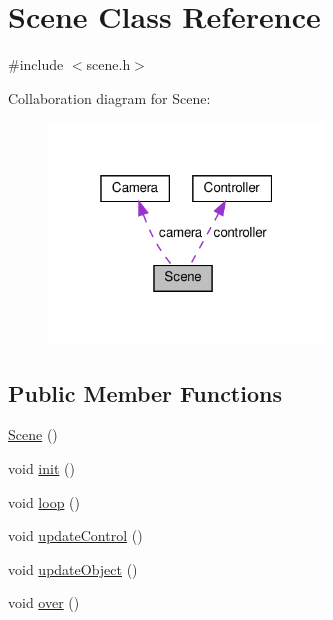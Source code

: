 \hypertarget{classScene}{}\section{Scene Class Reference}
\label{classScene}


{\ttfamily \#include $<$scene.\+h$>$}



Collaboration diagram for Scene\+:\nopagebreak
\begin{figure}[H]
\begin{center}
\leavevmode
\includegraphics[width=208pt]{classScene__coll__graph}
\end{center}
\end{figure}
\subsection*{Public Member Functions}
\begin{DoxyCompactItemize}
\item 
\hyperlink{classScene_ad10176d75a9cc0da56626f682d083507}{Scene} ()
\item 
void \hyperlink{classScene_abb3b6efc6fdba03cd96436edaf08a967}{init} ()
\item 
void \hyperlink{classScene_a8df1bf2075a891fb2929b58e85d79d34}{loop} ()
\item 
void \hyperlink{classScene_a3ec6a1b861488cd7ef4c31f8ac0ba3f0}{update\+Control} ()
\item 
void \hyperlink{classScene_a25ed345babc6bf277c57085509090f88}{update\+Object} ()
\item 
void \hyperlink{classScene_a1aba87f0c95af84af8aed0d7d3fb40e6}{over} ()
\end{DoxyCompactItemize}
